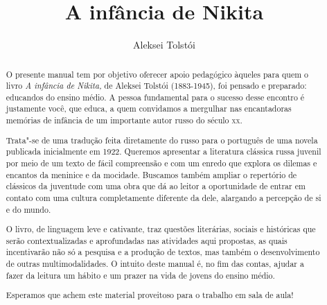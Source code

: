 \documentclass[11pt]{extarticle}
\begin{document}
\newcommand{\AutorLivro}{Aleksei Tolstói}
\newcommand{\TituloLivro}{A infância de Nikita}
\newcommand{\Tema}{Ficção, mistério e fantasia}
\newcommand{\Genero}{Romance}
\newcommand{\imagemCapa}{./images/PNLD0049-01.png}
\newcommand{\issnppub}{978-65-86862-06-5}
\newcommand{\issnepub}{978-65-86862-07-2}
\newcommand{\colaborador}{{Marina Darmaros} é jornalista e tradutora. Formada pela Cásper Líbero em Comunicação Social, tem mestrado em Jornalismo Internacional pela Universidade Russa da Amizade dos Povos (RUDN/Patrice Lumumba) e doutorado em Literatura e Cultura Russa pela Universidade de São Paulo.}


\title{\TituloLivro}
\author{\AutorLivro}
\def\authornotes{\colaborador}

\date{}
\maketitle



\begin{abstract}
O presente manual tem por objetivo oferecer apoio pedagógico àqueles
para quem o livro \emph{A infância de Nikita,} de Aleksei Tolstói
(1883-1945), foi pensado e preparado: educandos do ensino médio. A
pessoa fundamental para o sucesso desse encontro é justamente você, que
educa, a quem convidamos a mergulhar nas encantadoras memórias de
infância de um importante autor russo do século \textsc{xx}.

Trata"-se de uma tradução feita diretamente do russo para o português de
uma novela publicada inicialmente em 1922. Queremos apresentar a
literatura clássica russa juvenil por meio de um texto de fácil
compreensão e com um enredo que explora os dilemas e encantos da
meninice e da mocidade. Buscamos também ampliar o repertório de
clássicos da juventude com uma obra que dá ao leitor a oportunidade de
entrar em contato com uma cultura completamente diferente da dele,
alargando a percepção de si e do mundo.

O livro, de linguagem leve e cativante, traz questões literárias,
sociais e históricas que serão contextualizadas e aprofundadas nas
atividades aqui propostas, as quais incentivarão não só a pesquisa e a
produção de textos, mas também o desenvolvimento de outras
multimodalidades. O intuito deste manual é, no fim das contas, ajudar a
fazer da leitura um hábito e um prazer na vida de jovens do ensino
médio.

Esperamos que achem este material proveitoso para o trabalho em sala de
aula!

\end{abstract}
\end{document}
